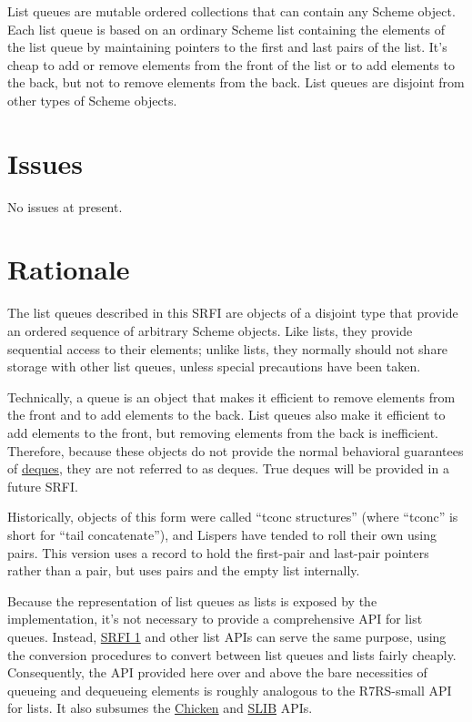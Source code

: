 List queues are mutable ordered collections that can contain any Scheme
object. Each list queue is based on an ordinary Scheme list containing
the elements of the list queue by maintaining pointers to the first and
last pairs of the list. It's cheap to add or remove elements from the
front of the list or to add elements to the back, but not to remove
elements from the back. List queues are disjoint from other types of
Scheme objects.

\section{Issues}\label{issues}

No issues at present.

\section{Rationale}\label{rationale}

The list queues described in this SRFI are objects of a disjoint type
that provide an ordered sequence of arbitrary Scheme objects. Like
lists, they provide sequential access to their elements; unlike lists,
they normally should not share storage with other list queues, unless
special precautions have been taken.

Technically, a queue is an object that makes it efficient to remove
elements from the front and to add elements to the back. List queues
also make it efficient to add elements to the front, but removing
elements from the back is inefficient. Therefore, because these objects
do not provide the normal behavioral guarantees of
\href{http://en.wikipedia.org/wiki/Double-ended_queue}{deques}, they are
not referred to as deques. True deques will be provided in a future
SRFI.

Historically, objects of this form were called ``tconc structures''
(where ``tconc'' is short for ``tail concatenate''), and Lispers have
tended to roll their own using pairs. This version uses a record to hold
the first-pair and last-pair pointers rather than a pair, but uses pairs
and the empty list internally.

Because the representation of list queues as lists is exposed by the
implementation, it's not necessary to provide a comprehensive API for
list queues. Instead,
\href{http://srfi.schemers.org/srfi-1/srfi-1.html}{SRFI 1} and other
list APIs can serve the same purpose, using the conversion procedures to
convert between list queues and lists fairly cheaply. Consequently, the
API provided here over and above the bare necessities of queueing and
dequeueing elements is roughly analogous to the R7RS-small API for
lists. It also subsumes the
\href{http://wiki.call-cc.org/man/4/Unit\%20data-structures\#queues}{Chicken}
and
\href{http://people.csail.mit.edu/jaffer/slib/Queues.html\#Queues}{​SLIB}
APIs.

